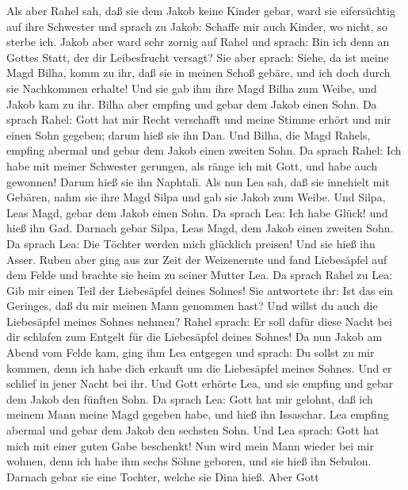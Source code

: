  Als aber Rahel sah, daß sie dem Jakob keine Kinder gebar,
ward sie eifersüchtig auf ihre Schwester und sprach zu Jakob: Schaffe
mir auch Kinder, wo nicht, so sterbe ich.  Jakob aber ward
sehr zornig auf Rahel und sprach: Bin ich denn an Gottes Statt, der dir
Leibesfrucht versagt?  Sie aber sprach: Siehe, da ist
meine Magd Bilha, komm zu ihr, daß sie in meinen Schoß gebäre, und ich
doch durch sie Nachkommen erhalte!  Und sie gab ihm ihre
Magd Bilha zum Weibe, und Jakob kam zu ihr.  Bilha aber
empfing und gebar dem Jakob einen Sohn.  Da sprach Rahel:
Gott hat mir Recht verschafft und meine Stimme erhört und mir einen Sohn
gegeben; darum hieß sie ihn Dan.  Und Bilha, die Magd
Rahels, empfing abermal und gebar dem Jakob einen zweiten Sohn.
 Da sprach Rahel: Ich habe mit meiner Schwester gerungen,
als ränge ich mit Gott, und habe auch gewonnen! Darum hieß sie ihn
Naphtali.  Als nun Lea sah, daß sie innehielt mit Gebären,
nahm sie ihre Magd Silpa und gab sie Jakob zum Weibe. 
Und Silpa, Leas Magd, gebar dem Jakob einen Sohn.  Da
sprach Lea: Ich habe Glück! und hieß ihn Gad.  Darnach
gebar Silpa, Leas Magd, dem Jakob einen zweiten Sohn.  Da
sprach Lea: Die Töchter werden mich glücklich preisen! Und sie hieß ihn
Asser.  Ruben aber ging aus zur Zeit der Weizenernte und
fand Liebesäpfel auf dem Felde und brachte sie heim zu seiner Mutter
Lea. Da sprach Rahel zu Lea: Gib mir einen Teil der Liebesäpfel deines
Sohnes!  Sie antwortete ihr: Ist das ein Geringes, daß du
mir meinen Mann genommen hast? Und willst du auch die Liebesäpfel meines
Sohnes nehmen? Rahel sprach: Er soll dafür diese Nacht bei dir schlafen
zum Entgelt für die Liebesäpfel deines Sohnes!  Da nun
Jakob am Abend vom Felde kam, ging ihm Lea entgegen und sprach: Du
sollst zu mir kommen, denn ich habe dich erkauft um die Liebesäpfel
meines Sohnes. Und er schlief in jener Nacht bei ihr. 
Und Gott erhörte Lea, und sie empfing und gebar dem Jakob den fünften
Sohn.  Da sprach Lea: Gott hat mir gelohnt, daß ich
meinem Mann meine Magd gegeben habe, und hieß ihn Issaschar.
 Lea empfing abermal und gebar dem Jakob den sechsten
Sohn.  Und Lea sprach: Gott hat mich mit einer guten Gabe
beschenkt! Nun wird mein Mann wieder bei mir wohnen, denn ich habe ihm
sechs Söhne geboren, und sie hieß ihn Sebulon.  Darnach
gebar sie eine Tochter, welche sie Dina hieß.  Aber Gott
